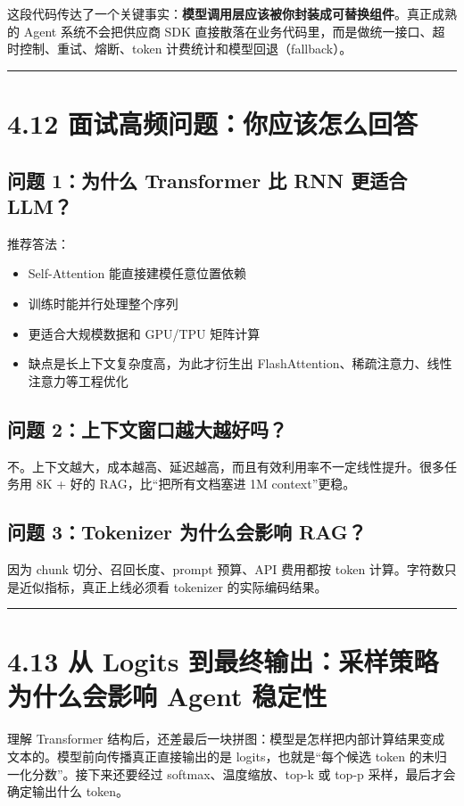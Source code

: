这段代码传达了一个关键事实：\textbf{模型调用层应该被你封装成可替换组件}。真正成熟的 Agent 系统不会把供应商 SDK 直接散落在业务代码里，而是做统一接口、超时控制、重试、熔断、token 计费统计和模型回退（fallback）。


\bigskip\hrule\bigskip

\section{4.12 面试高频问题：你应该怎么回答}

\subsection{问题 1：为什么 Transformer 比 RNN 更适合 LLM？}

推荐答法：


\begin{itemize}[leftmargin=2em]
\item Self-Attention 能直接建模任意位置依赖
\item 训练时能并行处理整个序列
\item 更适合大规模数据和 GPU/TPU 矩阵计算
\item 缺点是长上下文复杂度高，为此才衍生出 FlashAttention、稀疏注意力、线性注意力等工程优化
\end{itemize}

\subsection{问题 2：上下文窗口越大越好吗？}

不。上下文越大，成本越高、延迟越高，而且有效利用率不一定线性提升。很多任务用 8K + 好的 RAG，比``把所有文档塞进 1M context''更稳。


\subsection{问题 3：Tokenizer 为什么会影响 RAG？}

因为 chunk 切分、召回长度、prompt 预算、API 费用都按 token 计算。字符数只是近似指标，真正上线必须看 tokenizer 的实际编码结果。


\bigskip\hrule\bigskip

\section{4.13 从 Logits 到最终输出：采样策略为什么会影响 Agent 稳定性}

理解 Transformer 结构后，还差最后一块拼图：模型是怎样把内部计算结果变成文本的。模型前向传播真正直接输出的是 logits，也就是``每个候选 token 的未归一化分数''。接下来还要经过 softmax、温度缩放、top-k 或 top-p 采样，最后才会确定输出什么 token。


